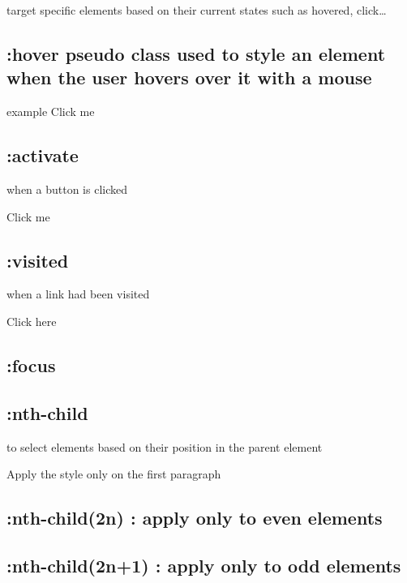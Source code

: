 \documentclass[
]{book}
\begin{document}
target specific elements based on their current states such as hovered, click\ldots{}

\hypertarget{hover-pseudo-class-used-to-style-an-element-when-the-user-hovers-over-it-with-a-mouse}{%
\subsection{:hover pseudo class used to style an element when the user hovers over it with a mouse}\label{hover-pseudo-class-used-to-style-an-element-when-the-user-hovers-over-it-with-a-mouse}}

example
Click me

\hypertarget{activate}{%
\subsection{:activate}\label{activate}}

when a button is clicked

Click me

\hypertarget{visited}{%
\subsection{:visited}\label{visited}}

when a link had been visited

Click here

\hypertarget{focus}{%
\subsection{:focus}\label{focus}}

\hypertarget{nth-child}{%
\subsection{:nth-child}\label{nth-child}}

to select elements based on their position in the parent element

Apply the style only on the first paragraph

\hypertarget{nth-child2n-apply-only-to-even-elements}{%
\subsection{:nth-child(2n) : apply only to even elements}\label{nth-child2n-apply-only-to-even-elements}}

\hypertarget{nth-child2n1-apply-only-to-odd-elements}{%
\subsection{:nth-child(2n+1) : apply only to odd elements}\label{nth-child2n1-apply-only-to-odd-elements}}
\end{document}

